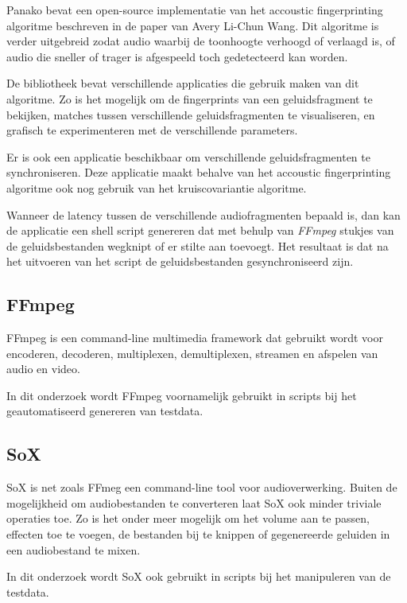 Panako bevat een open-source implementatie van het accoustic fingerprinting algoritme beschreven in de paper van Avery Li-Chun Wang\cite{Wang2003a}. Dit algoritme is verder uitgebreid zodat audio waarbij de toonhoogte verhoogd of verlaagd is, of audio die sneller of trager is afgespeeld toch gedetecteerd kan worden.

De bibliotheek bevat verschillende applicaties die gebruik maken van dit algoritme. Zo is het mogelijk om de fingerprints van een geluidsfragment te bekijken, matches tussen verschillende geluidsfragmenten te visualiseren, en grafisch te experimenteren met de verschillende parameters.

Er is ook een applicatie beschikbaar om verschillende geluidsfragmenten te synchroniseren. Deze applicatie maakt behalve van het accoustic fingerprinting algoritme ook nog gebruik van het kruiscovariantie algoritme. 

Wanneer de latency tussen de verschillende audiofragmenten bepaald is, dan kan de applicatie een shell script genereren dat met behulp van \textit{FFmpeg} stukjes van de geluidsbestanden wegknipt of er stilte aan toevoegt. Het resultaat is dat na het uitvoeren van het script de geluidsbestanden gesynchroniseerd zijn.

\subsection{FFmpeg}

FFmpeg is een command-line multimedia framework dat gebruikt wordt voor encoderen, decoderen, multiplexen, demultiplexen, streamen en afspelen van audio en video. \cite{kollarconfiguration}

In dit onderzoek wordt FFmpeg voornamelijk gebruikt in scripts bij het geautomatiseerd genereren van testdata.

\subsection{SoX}

SoX is net zoals FFmeg een command-line tool voor audioverwerking. Buiten de mogelijkheid om audiobestanden te converteren laat SoX ook minder triviale operaties toe. Zo is het onder meer mogelijk om het volume aan te passen, effecten toe te voegen, de bestanden bij te knippen of gegenereerde geluiden in een audiobestand te mixen.
\cite{barras2012sox}

In dit onderzoek wordt SoX ook gebruikt in scripts bij het manipuleren van de testdata.


